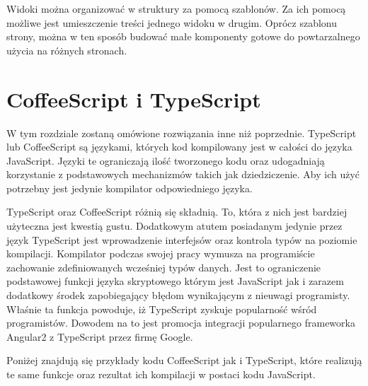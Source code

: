 Widoki można organizować w struktury za pomocą szablonów. Za ich pomocą możliwe jest umieszczenie treści jednego widoku w drugim. Oprócz szablonu strony, można w ten sposób budować małe komponenty gotowe do powtarzalnego użycia na różnych stronach.


\section{CoffeeScript i TypeScript}
W tym rozdziale zostaną omówione rozwiązania inne niż poprzednie. TypeScript lub CoffeeScript są językami, których kod kompilowany jest w całości do języka JavaScript\cite{typescript-book,}. Języki te ograniczają ilość tworzonego kodu oraz udogadniają korzystanie z podstawowych mechanizmów takich jak dziedziczenie. Aby ich użyć potrzebny jest jedynie kompilator odpowiedniego języka.

TypeScript oraz CoffeeScript różnią się składnią. To, która z nich jest bardziej użyteczna jest kwestią gustu. Dodatkowym atutem posiadanym jedynie przez język TypeScript jest wprowadzenie interfejsów oraz kontrola typów na poziomie kompilacji. Kompilator podczas swojej pracy wymusza na programiście zachowanie zdefiniowanych wcześniej typów danych. Jest to ograniczenie podstawowej funkcji języka skryptowego którym jest JavaScript jak i zarazem dodatkowy środek zapobiegający błędom wynikającym z nieuwagi programisty. Właśnie ta funkcja powoduje, iż TypeScript zyskuje popularność wśród programistów. Dowodem na to jest promocja integracji popularnego frameworka Angular2 z TypeScript przez firmę Google\cite{angular2-site}.

Poniżej znajdują się przykłady kodu CoffeeScript jak i TypeScript, które realizują te same funkcje oraz rezultat ich kompilacji w postaci kodu JavaScript. 
 
